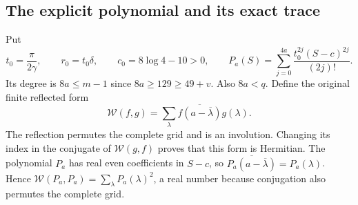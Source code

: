 \documentclass[11pt,a4paper]{article}
\begin{document}
\subsection{The explicit polynomial and its exact trace}
Put
\[
t_0=\frac\pi{2\gamma},\qquad r_0=t_0\delta,\qquad
c_0=8\log4-10>0,\qquad
P_a(S)=\sum_{j=0}^{4a}\frac{t_0^{2j}(S-c)^{2j}}{(2j)!}.
\tag{RBV2}
\]
Its degree is $8a\le m-1$ since $8a\ge129\ge49+v$.
Also $8a<q$. Define the original finite reflected form
\[
\mathcal W(f,g)=\sum_{\lambda}\overline{f(a-\overline\lambda)}g(\lambda).
\tag{RBV3}
\]
The reflection permutes the complete grid and is an involution.
Changing its index in the conjugate of $\mathcal W(g,f)$ proves
that this form is Hermitian. The polynomial $P_a$ has real even
coefficients in $S-c$, so
$\overline{P_a(a-\overline\lambda)}=P_a(\lambda)$.
Hence $\mathcal W(P_a,P_a)=\sum_\lambda P_a(\lambda)^2$, a real
number because conjugation also permutes the complete grid.
\end{document}

